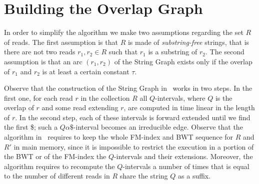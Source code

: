 \documentclass[runningheads,envcountsame,a4paper]{llncs}
\newcommand{\notaestesa}[2]{%
 \marginpar{\color{red!75!black}\textbf{\texttimes}}%
 {\color{red!75!black}%
 [\,\textbullet\,\textsf{\textbf{#1:}} %
 \textsf{\footnotesize#2}\,\textbullet\,]}%
}
\newcommand{\MP}[1]{\notaestesa{MP}{#1}}
\begin{document}
\section{Building the Overlap Graph}







In order to simplify the algorithm we make two assumptions regarding the set $R$
of reads.
The first assumption is that $R$ is made of \emph{substring-free} strings, that is there are not two reads $r_{1}, r_{2}\in R$ such that
$r_{1}$  is a substring of  $r_{2}$.
The second assumption is that an arc $(r_{1}, r_{2})$ of the String Graph exists only if the overlap of $r_{1}$ and $r_{2}$ is at least a certain constant $\tau$.



Observe that the construction of the String Graph in~\cite{Simpson2010} works in two
steps.
In the first one, for each read $r$ in the collection $R$ all
$Q$-intervals, where $Q$ is the overlap of $r$ and some read extending $r$,
are computed in time linear in
the  length of $r$.
In the second step, each of these intervals is forward extended until
we find the first \$; such a $Q\alpha\$$-interval becomes an
irreducible edge.
Observe that the algorithm  in~\cite{Simpson2010} requires to keep the whole FM-index
and BWT sequence for $R$ and $R'$ in main memory, since it is impossible to
restrict the execution in a portion of the BWT or of the FM-index the $Q$-intervals
and their extensions.
Moreover, the algorithm requires to recompute the $Q$-intervals a number of
times that is equal to the number of different reads in $R$ share the
string $Q$ as a suffix.
\end{document}
